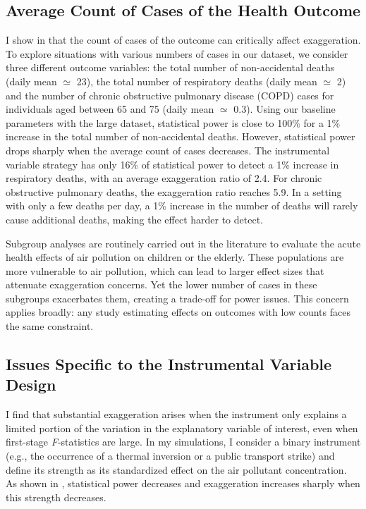 \documentclass[12pt]{article}
\begin{document}
        \subsection{Average Count of Cases of the Health Outcome}
    
            
            
            I show in  that the count of cases of the outcome can critically affect exaggeration. To explore situations with various numbers of cases in our dataset, we consider three different outcome variables: the total number of non-accidental deaths (daily mean $\simeq$ 23), the total number of respiratory deaths (daily mean  $\simeq$ 2) and the number of chronic obstructive pulmonary disease (COPD) cases for individuals aged between 65 and 75 (daily mean  $\simeq$  0.3). Using our baseline parameters with the large dataset, statistical power is close to 100\% for a 1\% increase in the total number of non-accidental deaths. However, statistical power drops sharply when the average count of cases decreases. The instrumental variable strategy has only 16\% of statistical power to detect a 1\% increase in respiratory deaths, with an average exaggeration ratio of 2.4. For chronic obstructive pulmonary deaths, the exaggeration ratio reaches 5.9. In a setting with only a few deaths per day, a 1\% increase in the number of deaths will rarely cause additional deaths, making the effect harder to detect.
            
            Subgroup analyses are routinely carried out in the literature to evaluate the acute health effects of air pollution on children or the elderly. These populations are more vulnerable to air pollution, which can lead to larger effect sizes that attenuate exaggeration concerns. Yet the lower number of cases in these subgroups exacerbates them, creating a trade-off for power issues. This concern applies broadly: any study estimating effects on outcomes with low counts faces the same constraint.

        \subsection{Issues Specific to the Instrumental Variable Design}
        
        		I find that substantial exaggeration arises when the instrument only explains a limited portion of the variation in the explanatory variable of interest, even when first-stage \textit{F}-statistics are large. In my simulations, I consider a binary instrument (e.g., the occurrence of a thermal inversion or a public transport strike) and define its strength as its standardized effect on the air pollutant concentration. As shown in , statistical power decreases and exaggeration increases sharply when this strength decreases. 
            
\end{document}
